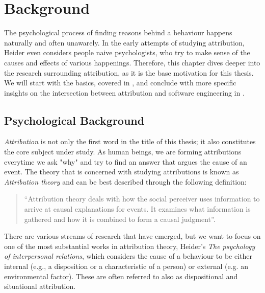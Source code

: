 \chapter{Background}


The psychological process of finding reasons behind a behaviour happens naturally and often unawarely. In the early attempts of studying attribution, Heider \cite{Heider1958} even considers people naive psychologists, who try to make sense of the causes and effects of various happenings. Therefore, this chapter dives deeper into the research surrounding attribution, as it is the base motivation for this thesis. We will start with the basics, covered in \textit{}, and conclude with more specific insights on the intersection between attribution and software engineering in \textit{}. 


\section{Psychological Background} \label{PsychologicalBackground}

\textit{Attribution} is not only the first word in the title of this thesis; it also constitutes the core subject under study. As human beings, we are forming attributions everytime we ask "why" and try to find an answer that argues the cause of an event. The theory that is concerned with studying attributions is known as \textit{Attribution theory} and can be best described through the following definition: 

\begin{quote}
“Attribution theory deals with how the social perceiver uses information to arrive at causal explanations for events. It examines what information is gathered and how it is combined to form a causal judgment”. \cite{Fiske1991}
\end{quote}

There are various streams of research that have emerged, but we want to focus on one of the most substantial works in attribution theory, Heider's \textit{The psychology of interpersonal relations}, which considers the cause of a behaviour to be either internal (e.g., a disposition or a characteristic of a person) or external (e.g. an environmental factor). These are often referred to also as dispositional and situational attribution. 

